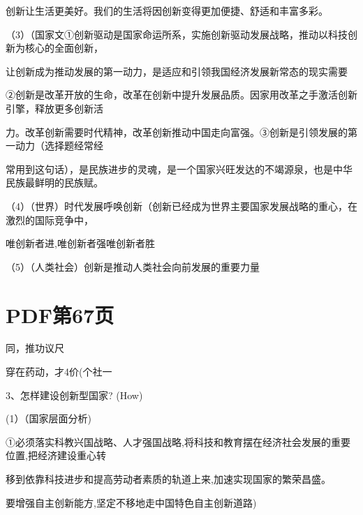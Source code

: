\documentclass[lang=cn,11pt]{elegantbook}
\newcommand{\daofasym}[1]{{\daofasymbolfont #1}}
\newcommand{\daofasym}[1]{#1}
\begin{document}
创新让生活更美好。我们的生活将因创新变得更加便捷、舒适和丰富多彩。\par

（3）（国家文\daofasym{①}创新驱动是国家命运所系，实施创新驱动发展战略，推动以科技创新为核心的全面创新，\par

让创新成为推动发展的第一动力，是适应和引领我国经济发展新常态的现实需要\par

\daofasym{②}创新是改革开放的生命，改革在创新中提升发展品质。因家用改革之手激活创新引擎，释放更多创新活\par

力。改革创新需要时代精神，改革创新推动中国走向富强。\daofasym{③}创新是引领发展的第一动力（选择题经常经\par

常用到这句话），是民族进步的灵魂，是一个国家兴旺发达的不竭源泉，也是中华民族最鲜明的民族赋。\par

（4）（世界）时代发展呼唤创新（创新已经成为世界主要国家发展战略的重心，在激烈的国际竞争中，\par

唯创新者进,唯创新者强唯创新者胜\par

（5）（人类社会）创新是推动人类社会向前发展的重要力量\par


\section*{PDF第67页}

同，推功议尺\par

穿在药动，才4价(个社一\par

3、怎样建设创新型国家? (How)\par

(1）（国家层面分析)\par

\daofasym{①}必须落实科教兴国战略、人才强国战略,将科技和教育摆在经济社会发展的重要位置,把经济建设重心转\par

移到依靠科技进步和提高劳动者素质的轨道上来,加速实现国家的繁荣昌盛。\par

要增强自主创新能方,坚定不移地走中国特色自主创新道路)\par
\end{document}
